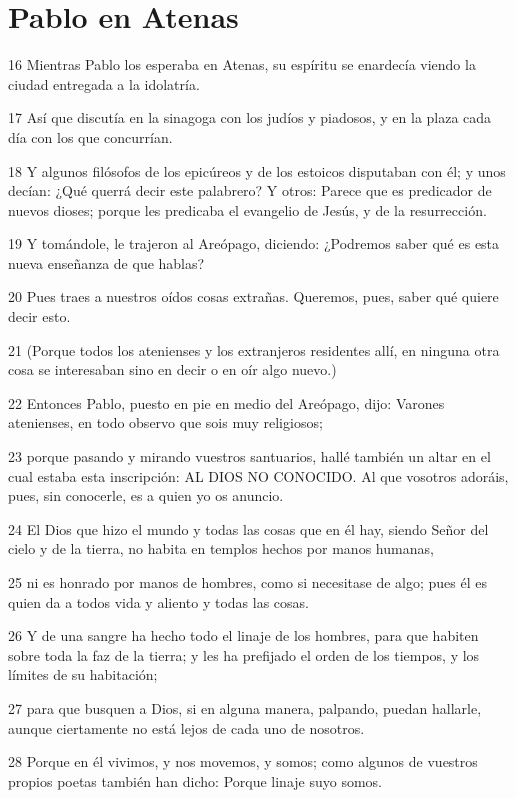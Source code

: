 \section*{Pablo en Atenas}

\par 16 Mientras Pablo los esperaba en Atenas, su espíritu se enardecía viendo la ciudad entregada a la idolatría.
\par 17 Así que discutía en la sinagoga con los judíos y piadosos, y en la plaza cada día con los que concurrían.
\par 18 Y algunos filósofos de los epicúreos y de los estoicos disputaban con él; y unos decían: ¿Qué querrá decir este palabrero? Y otros: Parece que es predicador de nuevos dioses; porque les predicaba el evangelio de Jesús, y de la resurrección.
\par 19 Y tomándole, le trajeron al Areópago, diciendo: ¿Podremos saber qué es esta nueva enseñanza de que hablas?
\par 20 Pues traes a nuestros oídos cosas extrañas. Queremos, pues, saber qué quiere decir esto.
\par 21 (Porque todos los atenienses y los extranjeros residentes allí, en ninguna otra cosa se interesaban sino en decir o en oír algo nuevo.)
\par 22 Entonces Pablo, puesto en pie en medio del Areópago, dijo: Varones atenienses, en todo observo que sois muy religiosos;
\par 23 porque pasando y mirando vuestros santuarios, hallé también un altar en el cual estaba esta inscripción: AL DIOS NO CONOCIDO. Al que vosotros adoráis, pues, sin conocerle, es a quien yo os anuncio.
\par 24 El Dios que hizo el mundo y todas las cosas que en él hay, siendo Señor del cielo y de la tierra, no habita en templos hechos por manos humanas,
\par 25 ni es honrado por manos de hombres, como si necesitase de algo; pues él es quien da a todos vida y aliento y todas las cosas.
\par 26 Y de una sangre ha hecho todo el linaje de los hombres, para que habiten sobre toda la faz de la tierra; y les ha prefijado el orden de los tiempos, y los límites de su habitación;
\par 27 para que busquen a Dios, si en alguna manera, palpando, puedan hallarle, aunque ciertamente no está lejos de cada uno de nosotros.
\par 28 Porque en él vivimos, y nos movemos, y somos; como algunos de vuestros propios poetas también han dicho: Porque linaje suyo somos.
